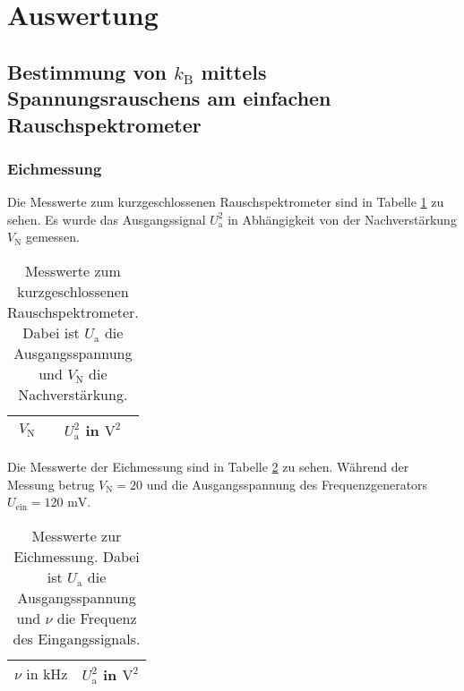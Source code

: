 

\section{Auswertung}

\subsection{Bestimmung von $k_\text{B}$ mittels Spannungsrauschens am 
			einfachen Rauschspektrometer}
		
	
	\subsubsection{Eichmessung}
	
		Die Messwerte zum kurzgeschlossenen Rauschspektrometer sind 
		in Tabelle \ref{tab:eichung_eigenrauschen_einfach} zu sehen. 
		Es wurde das Ausgangssignal $U^2_\text{a}$ in Abhängigkeit von 
		der Nachverstärkung $V_\text{N}$ gemessen.
		
		\begin{table}[h]
		\centering
			\begin{tabular}{cc}
				\toprule \midrule
				$V_\text{N}$ & $U^2_\text{a}$ in $\text{V}^2$
				\\
				\midrule
				
				\midrule \bottomrule
			\end{tabular}
			\caption{Messwerte zum kurzgeschlossenen 
			Rauschspektrometer. Dabei ist $U_\text{a}$ die 
			Ausgangsspannung und $V_\text{N}$ die Nachverstärkung.}
			\label{tab:eichung_eigenrauschen_einfach}
		\end{table}
		
		Die Messwerte der Eichmessung sind in Tabelle 
		\ref{tab:eichung_einfach} zu sehen. Während der Messung 
		betrug $V_\text{N}=20$ und die Ausgangsspannung des 
		Frequenzgenerators $U_\text{ein} = 120 \text{ mV}$.
		
		\begin{table}[h]
		\centering
			\begin{tabular}{cc}
				\toprule \midrule
				$\nu \text{ in} \text{ kHz}$ & $U^2_\text{a}$ in $\text{V}^2$ 
				\\
				\midrule
				
				\midrule \bottomrule
			\end{tabular}
			\caption{Messwerte zur Eichmessung. Dabei ist $U_\text{a}$ 
			die 
			Ausgangsspannung und $\nu$ die Frequenz des 
			Eingangssignals. }
			\label{tab:eichung_einfach}
		\end{table}
		
